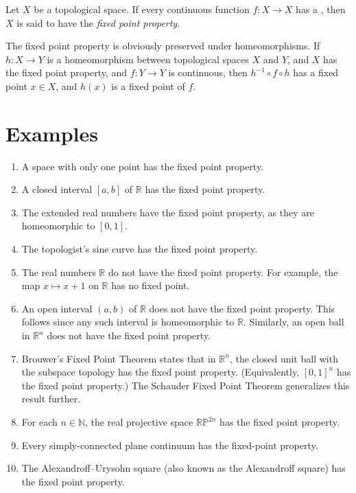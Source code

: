\documentclass[12pt]{article}
\newcommand{\sN}{\mathbb{N}}
\newcommand{\sR}{\mathbb{R}}
\newcommand{\RP}{\mathbb{RP}}
\begin{document}

Let $X$ be a topological space.
If every continuous function $f\colon X\to X$ has a 
, 
then $X$ is said to have the \emph{fixed point property}.

The fixed point property is obviously preserved under homeomorphisms.
If $h\colon X\to Y$ is a homeomorphism between topological
spaces $X$ and $Y$, and $X$ has the fixed point property,
and $f\colon Y\to Y$ is continuous,
then $h^{-1}\circ f\circ h$ has a fixed point $x\in X$,
and $h(x)$ is a fixed point of $f$.

\section*{Examples}
\begin{enumerate}
\item A space with only one point has the fixed point property.
\item A closed interval $[a,b]$ of $\sR$ has the fixed point property.
\item The extended real numbers have the fixed point property,
as they are homeomorphic to $[0,1]$.
\item The topologist's sine curve has the fixed point property.
\item The real numbers $\sR$ do not have the fixed point property.
For example, the map $x\mapsto x+1$ on $\sR$ has no fixed point.
\item An open interval $(a,b)$ of $\sR$ does not have the fixed point property.
This follows since any such interval is homeomorphic to $\sR$.
Similarly, an open ball in $\sR^n$ does not have the fixed point property.
\item Brouwer's Fixed Point Theorem states that in $\sR^n$,
the closed unit ball with the subspace topology has the fixed point property.
(Equivalently, $[0,1]^n$ has the fixed point property.)
The Schauder Fixed Point Theorem generalizes this result further.
\item For each $n\in\sN$, the real projective space $\RP^{2n}$ has the fixed point property.
\item Every simply-connected plane continuum has the fixed-point property.
\item The Alexandroff--Urysohn square (also known as the Alexandroff square)
has the fixed point property.
\end{enumerate}
\end{document}
